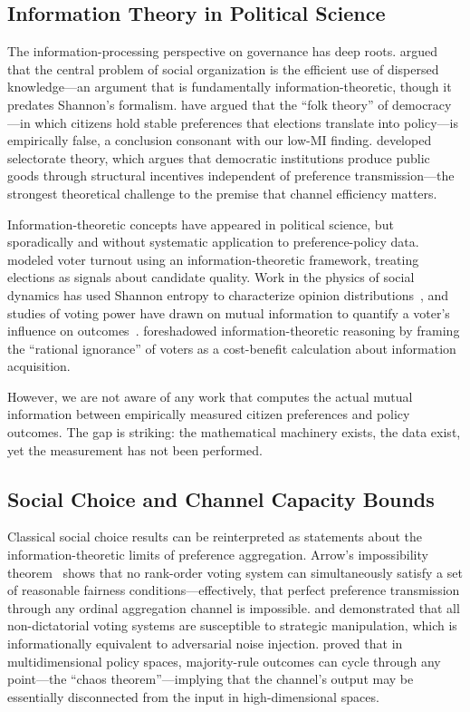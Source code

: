 \documentclass[twocolumn,10pt]{article}
\begin{document}
\subsection{Information Theory in Political Science}

The information-processing perspective on governance has deep roots.  \citet{hayek1945} argued that the central problem of social organization is the efficient use of dispersed knowledge---an argument that is fundamentally information-theoretic, though it predates Shannon's formalism.  \citet{achen2016} have argued that the ``folk theory'' of democracy---in which citizens hold stable preferences that elections translate into policy---is empirically false, a conclusion consonant with our low-MI finding.  \citet{bueno2003} developed selectorate theory, which argues that democratic institutions produce public goods through structural incentives independent of preference transmission---the strongest theoretical challenge to the premise that channel efficiency matters.

Information-theoretic concepts have appeared in political science, but sporadically and without systematic application to preference-policy data.  \citet{matsusaka1995} modeled voter turnout using an information-theoretic framework, treating elections as signals about candidate quality.  Work in the physics of social dynamics has used Shannon entropy to characterize opinion distributions~\citep{caticha2015}, and studies of voting power have drawn on mutual information to quantify a voter's influence on outcomes~\citep{kirsch2007}.  \citet{downs1957} foreshadowed information-theoretic reasoning by framing the ``rational ignorance'' of voters as a cost-benefit calculation about information acquisition.

However, we are not aware of any work that computes the actual mutual information between empirically measured citizen preferences and policy outcomes.  The gap is striking: the mathematical machinery exists, the data exist, yet the measurement has not been performed.

\subsection{Social Choice and Channel Capacity Bounds}

Classical social choice results can be reinterpreted as statements about the information-theoretic limits of preference aggregation.  Arrow's impossibility theorem~\citep{arrow1951} shows that no rank-order voting system can simultaneously satisfy a set of reasonable fairness conditions---effectively, that perfect preference transmission through any ordinal aggregation channel is impossible.  \citet{gibbard1973} and \citet{satterthwaite1975} demonstrated that all non-dictatorial voting systems are susceptible to strategic manipulation, which is informationally equivalent to adversarial noise injection.  \citet{mckelvey1976} proved that in multidimensional policy spaces, majority-rule outcomes can cycle through any point---the ``chaos theorem''---implying that the channel's output may be essentially disconnected from the input in high-dimensional spaces.
\end{document}
